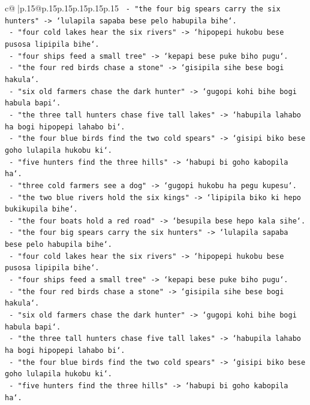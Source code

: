 \documentclass{article}
\begin{document}
{\begin{supertabular}{c@{$\;$}|p{.15\linewidth}@{}p{.15\linewidth}p{.15\linewidth}p{.15\linewidth}p{.15\linewidth}p{.15\linewidth}}
{{{\texttt{  {-} "the four big spears carry the six hunters" {-}> `lulapila sapaba bese pelo habupila bihe`.} \\
\texttt{  {-} "four cold lakes hear the six rivers" {-}> `hipopepi hukobu bese pusosa lipipila bihe`.} \\
\texttt{  {-} "four ships feed a small tree" {-}> `kepapi bese puke biho pugu`.} \\
\texttt{  {-} "the four red birds chase a stone" {-}> `gisipila sihe bese bogi hakula`.} \\
\texttt{  {-} "six old farmers chase the dark hunter" {-}> `gugopi kohi bihe bogi habula bapi`.} \\
\texttt{  {-} "the three tall hunters chase five tall lakes" {-}> `habupila lahabo ha bogi hipopepi lahabo bi`.} \\
\texttt{  {-} "the four blue birds find the two cold spears" {-}> `gisipi biko bese goho lulapila hukobu ki`.} \\
\texttt{  {-} "five hunters find the three hills" {-}> `habupi bi goho kabopila ha`.} \\
\texttt{  {-} "three cold farmers see a dog" {-}> `gugopi hukobu ha pegu kupesu`.} \\
\texttt{  {-} "the two blue rivers hold the six kings" {-}> `lipipila biko ki hepo bukikupila bihe`.} \\
\texttt{  {-} "the four boats hold a red road" {-}> `besupila bese hepo kala sihe`.} \\
\texttt{  {-} "the four big spears carry the six hunters" {-}> `lulapila sapaba bese pelo habupila bihe`.} \\
\texttt{  {-} "four cold lakes hear the six rivers" {-}> `hipopepi hukobu bese pusosa lipipila bihe`.} \\
\texttt{  {-} "four ships feed a small tree" {-}> `kepapi bese puke biho pugu`.} \\
\texttt{  {-} "the four red birds chase a stone" {-}> `gisipila sihe bese bogi hakula`.} \\
\texttt{  {-} "six old farmers chase the dark hunter" {-}> `gugopi kohi bihe bogi habula bapi`.} \\
\texttt{  {-} "the three tall hunters chase five tall lakes" {-}> `habupila lahabo ha bogi hipopepi lahabo bi`.} \\
\texttt{  {-} "the four blue birds find the two cold spears" {-}> `gisipi biko bese goho lulapila hukobu ki`.} \\
\texttt{  {-} "five hunters find the three hills" {-}> `habupi bi goho kabopila ha`.} \\
}}}
\end{supertabular}}
\end{document}
